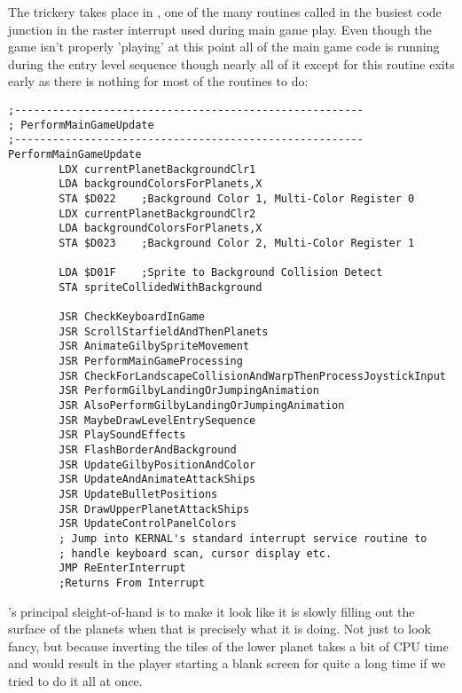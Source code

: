 The trickery takes place in , one of the many routines called in
the busiest code junction in the raster interrupt used during main game play. Even though the game
isn't properly 'playing' at this point all of the main game code is running during the entry
level sequence though nearly all of it except for this routine exits early as there is nothing
for most of the routines to do:

\begin{lstlisting}[caption=\icode{PerformMainGameUpdate}\, the spaghetti junction handling nearly everything
during main gameplay. We'll see more of this code section later in the book\. During the entry level sequence
it is \icode{MaybeDrawLevelEntrySequence} and \icode{PlaySoundEffects} that do most of the work.]
;-------------------------------------------------------
; PerformMainGameUpdate
;-------------------------------------------------------
PerformMainGameUpdate
        LDX currentPlanetBackgroundClr1
        LDA backgroundColorsForPlanets,X
        STA $D022    ;Background Color 1, Multi-Color Register 0
        LDX currentPlanetBackgroundClr2
        LDA backgroundColorsForPlanets,X
        STA $D023    ;Background Color 2, Multi-Color Register 1

        LDA $D01F    ;Sprite to Background Collision Detect
        STA spriteCollidedWithBackground

        JSR CheckKeyboardInGame
        JSR ScrollStarfieldAndThenPlanets
        JSR AnimateGilbySpriteMovement
        JSR PerformMainGameProcessing
        JSR CheckForLandscapeCollisionAndWarpThenProcessJoystickInput
        JSR PerformGilbyLandingOrJumpingAnimation
        JSR AlsoPerformGilbyLandingOrJumpingAnimation
        JSR MaybeDrawLevelEntrySequence
        JSR PlaySoundEffects
        JSR FlashBorderAndBackground
        JSR UpdateGilbyPositionAndColor
        JSR UpdateAndAnimateAttackShips
        JSR UpdateBulletPositions
        JSR DrawUpperPlanetAttackShips
        JSR UpdateControlPanelColors
        ; Jump into KERNAL's standard interrupt service routine to 
        ; handle keyboard scan, cursor display etc.
        JMP ReEnterInterrupt 
        ;Returns From Interrupt
\end{lstlisting}

's principal sleight-of-hand is to make it look like it is slowly filling
out the surface of the planets when that is precisely what it is doing. Not just to look fancy, but because
inverting the tiles of the lower planet takes a bit of CPU time and would result in the player starting a blank screen
for quite a long time if we tried to do it all at once.

